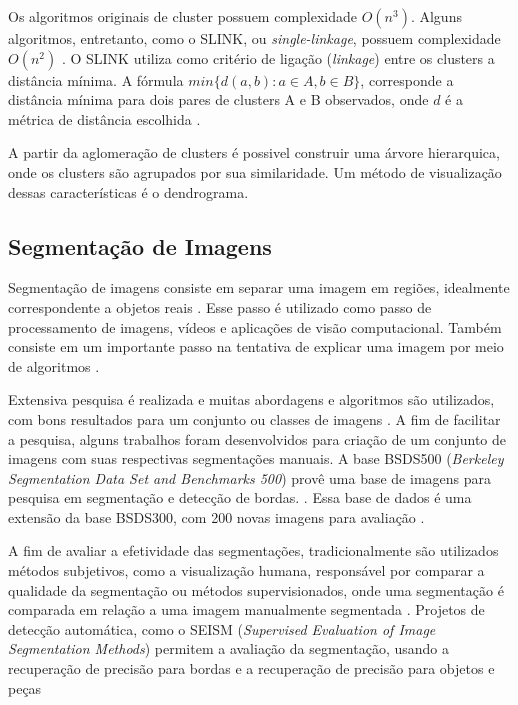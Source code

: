 \begin{document}
Os algoritmos originais de cluster possuem complexidade $O(n^3)$. Alguns algoritmos, entretanto, como o SLINK, ou \textit{single-linkage}, possuem complexidade $O(n^2)$ \cite{SLINK}. O SLINK utiliza como critério de ligação (\textit{linkage}) entre os clusters a distância mínima. A fórmula $min\{d(a,b): a \in A, b \in B \}$, corresponde a distância mínima para dois pares de clusters A e B observados, onde $d$ é a métrica de distância escolhida \cite{WIKI_CLUSTER_HIERARCHY}.

A partir da aglomeração de clusters é possivel construir uma árvore hierarquica, onde os clusters são agrupados por sua similaridade. Um método de visualização dessas características é o dendrograma. 


\subsection{Segmentação de Imagens} \label{ssec:segmentacao}

Segmentação de imagens consiste em separar uma imagem em regiões, idealmente correspondente a objetos reais \cite{ZHANG2008}. Esse passo é utilizado como passo de processamento de imagens, vídeos e aplicações de visão computacional. Também consiste em um importante passo na tentativa de explicar uma imagem por meio de algoritmos \cite{ZHANG2008}.

Extensiva pesquisa é realizada e muitas abordagens e algoritmos são utilizados, com bons resultados para um conjunto ou classes de imagens \cite{ZHANG2008}. A fim de facilitar a pesquisa, alguns trabalhos foram desenvolvidos para criação de um conjunto de imagens com suas respectivas segmentações manuais. A base BSDS500 (\textit{Berkeley Segmentation Data Set and Benchmarks 500}) provê uma base de imagens para pesquisa em segmentação e detecção de bordas. \cite{BSDS500}. Essa base de dados é uma extensão da base BSDS300, com 200 novas imagens para avaliação \cite{BSDS500}.

A fim de avaliar a efetividade das segmentações, tradicionalmente são utilizados métodos subjetivos, como a visualização humana, responsável por comparar a qualidade da segmentação ou métodos supervisionados, onde uma segmentação é comparada em relação a uma imagem manualmente segmentada \cite{ZHANG2008}. Projetos de detecção automática, como o SEISM (\textit{Supervised Evaluation of Image Segmentation Methods}) permitem a avaliação da segmentação, usando a recuperação de precisão para bordas e a recuperação de precisão para objetos e peças \cite{SEISM}
\end{document}
